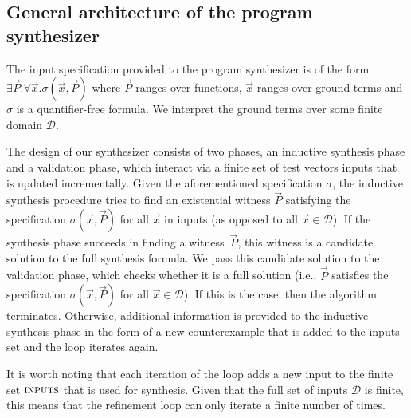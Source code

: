 \documentclass[runningheads,a4paper]{llncs}
\begin{document}
\subsection{General architecture of the program synthesizer}
\label{synthesizer-general}
%
% 
The input specification provided to the program synthesizer is of the form
$\exists \vec{P} .  \forall \vec{x}.  \sigma(\vec{x}, \vec{P})$ where
$\vec{P}$ ranges over functions, $\vec{x}$ ranges over ground terms and
$\sigma$ is a quantifier-free formula.  We interpret the ground terms over
some finite domain $\mathcal{D}$.

The design of our synthesizer 
consists of two phases, an inductive synthesis phase and a validation phase,
which interact via a finite set of test vectors {\sc inputs} that is updated incrementally. 
Given the aforementioned specification $\sigma$, the inductive synthesis
procedure
tries to find an existential witness $\vec{P}$ satisfying the specification
$\sigma(\vec{x}, \vec{P})$ for all $\vec{x}$ in {\sc inputs} (as opposed to
all $\vec{x} \in \mathcal{D}$).
%
If the synthesis phase succeeds in finding a witness~$\vec{P}$, this witness
is a candidate solution to the full synthesis formula.  We pass this
candidate solution to the validation phase, which checks whether it is a full
solution (i.e., $\vec{P}$ satisfies the specification $\sigma(\vec{x},
\vec{P})$ for all $\vec{x}\in\mathcal{D}$).
%
%
%
If this is the case, then the algorithm terminates.  Otherwise, additional
information is provided to the inductive synthesis phase in the form of a new
counterexample that is added to the {\sc inputs} set and the loop iterates
again.

It is
worth noting that each iteration of the loop adds a new input to the
finite set $\text{\sc inputs}$ that is used for synthesis.  Given that
the full set of inputs $\mathcal{D}$
is finite, this means that the refinement loop
can only iterate a finite number of times.
\end{document}
